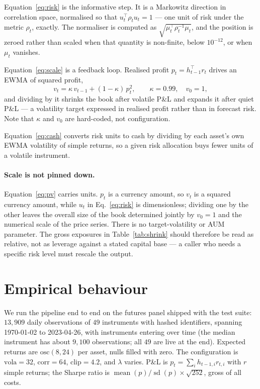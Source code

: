 \documentclass[11pt,a4paper]{article}
\begin{document}
Equation~\eqref{eq:risk} is the informative step. It is a Markowitz direction
\citep{markowitz1952} in correlation space, normalised so that
$u_t^{\top} \rho_t u_t = 1$ --- one unit of risk under the metric $\rho_t$,
exactly. The normaliser is computed as
$\sqrt{\mu_t^{\top}\rho_t^{-1}\mu_t}$, and the position is zeroed rather than
scaled when that quantity is non-finite, below $10^{-12}$, or when $\mu_t$
vanishes.

Equation~\eqref{eq:scale} is a feedback loop. Realised profit
$p_t = h_{t-1}^{\top} r_t$ drives an EWMA of squared profit,
\begin{equation}
  v_t = \kappa \, v_{t-1} + (1-\kappa) \, p_t^2,
  \qquad \kappa = 0.99, \quad v_0 = 1,
  \label{eq:pv}
\end{equation}
and dividing by it shrinks the book after volatile P\&L and expands it after
quiet P\&L --- a volatility target expressed in realised profit rather than in
forecast risk. Note that $\kappa$ and $v_0$ are hard-coded, not configuration.

Equation~\eqref{eq:cash} converts risk units to cash by dividing by each asset's
own EWMA volatility of simple returns, so a given risk allocation buys fewer
units of a volatile instrument.

\paragraph{Scale is not pinned down.}
Equation~\eqref{eq:pv} carries units. $p_t$ is a currency amount, so $v_t$ is a
squared currency amount, while $u_t$ in Eq.~\eqref{eq:risk} is dimensionless;
dividing one by the other leaves the overall size of the book determined jointly
by $v_0 = 1$ and the numerical scale of the price series. There is no
target-volatility or AUM parameter. The gross exposures in
Table~\ref{tab:shrink} should therefore be read as relative, not as leverage
against a stated capital base --- a caller who needs a specific risk level must
rescale the output.

\section{Empirical behaviour}
\label{sec:empirical}

We run the pipeline end to end on the futures panel shipped with the test suite:
$13{,}909$ daily observations of $49$ instruments with hashed identifiers,
spanning 1970-01-02 to 2023-04-26, with instruments entering over time (the
median instrument has about $9{,}100$ observations; all $49$ are live at the
end). Expected returns are $\mathrm{osc}(8, 24)$ per asset, nulls filled with
zero. The configuration is $\mathrm{vola}=32$, $\mathrm{corr}=64$,
$\mathrm{clip}=4.2$, and $\lambda$ varies. P\&L is
$p_t = \sum_i h_{t-1,i} r_{t,i}$ with $r$ simple returns; the Sharpe ratio is
$\operatorname{mean}(p)/\operatorname{sd}(p) \times \sqrt{252}$, gross of all
costs.
\end{document}
